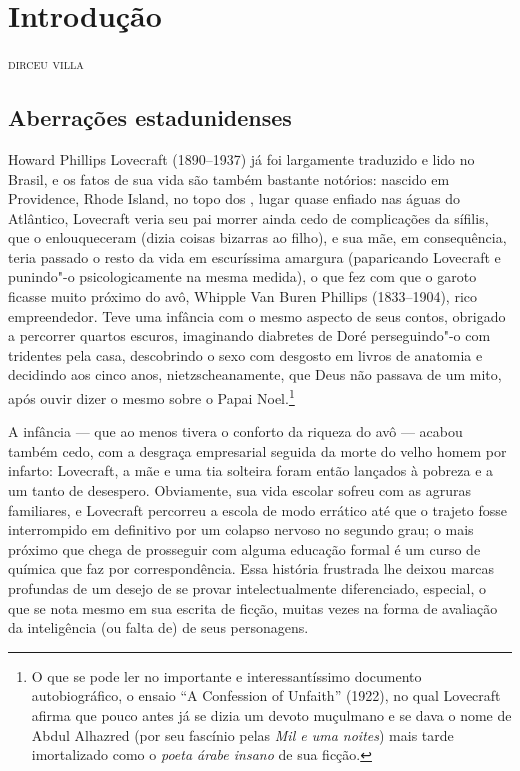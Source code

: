 
\chapter[Introdução, \emph{por Dirceu Villa}]{Introdução}

\hfill\textsc{dirceu villa}

\bigskip

\section{Aberrações estadunidenses}

\noindent{}Howard Phillips Lovecraft (1890--1937) já foi largamente traduzido e lido
no Brasil, e os fatos de sua vida são também bastante notórios: nascido
em Providence, Rhode Island, no topo dos , lugar quase enfiado nas
águas do Atlântico, Lovecraft veria seu pai morrer ainda cedo de
complicações da sífilis, que o enlouqueceram (dizia coisas bizarras ao
filho), e sua mãe, em consequência, teria passado o resto da vida em
escuríssima amargura (paparicando Lovecraft e punindo"-o psicologicamente
na mesma medida), o que fez com que o garoto ficasse muito próximo do
avô, Whipple Van Buren Phillips (1833--1904), rico empreendedor. Teve uma
infância com o mesmo aspecto de seus contos, obrigado a percorrer
quartos escuros, imaginando diabretes de Doré perseguindo"-o com
tridentes pela casa, descobrindo o sexo com desgosto em livros de
anatomia e decidindo aos cinco anos, nietzscheanamente, que Deus não
passava de um mito, após ouvir dizer o mesmo sobre o Papai
Noel.\footnote{O que se pode ler no importante e interessantíssimo
  documento autobiográfico, o ensaio ``A Confession of Unfaith'' (1922),
  no qual Lovecraft afirma que pouco antes já se dizia um devoto
  muçulmano e se dava o nome de Abdul Alhazred (por seu fascínio pelas
  \emph{Mil e uma noites}) mais tarde imortalizado como o \emph{poeta
  árabe insano} de sua ficção.}

A infância --- que ao menos tivera o conforto da riqueza do avô ---
acabou também cedo, com a desgraça empresarial seguida da morte do velho
homem por infarto: Lovecraft, a mãe e uma tia solteira foram então
lançados à pobreza e a um tanto de desespero. Obviamente, sua vida
escolar sofreu com as agruras familiares, e Lovecraft percorreu a escola
de modo errático até que o trajeto fosse interrompido em definitivo por
um colapso nervoso no segundo grau; o mais próximo que chega de
prosseguir com alguma educação formal é um curso de química que faz por
correspondência. Essa história frustrada lhe deixou marcas profundas de
um desejo de se provar intelectualmente diferenciado, especial, o que se
nota mesmo em sua escrita de ficção, muitas vezes na forma de avaliação
da inteligência (ou falta de) de seus personagens.

